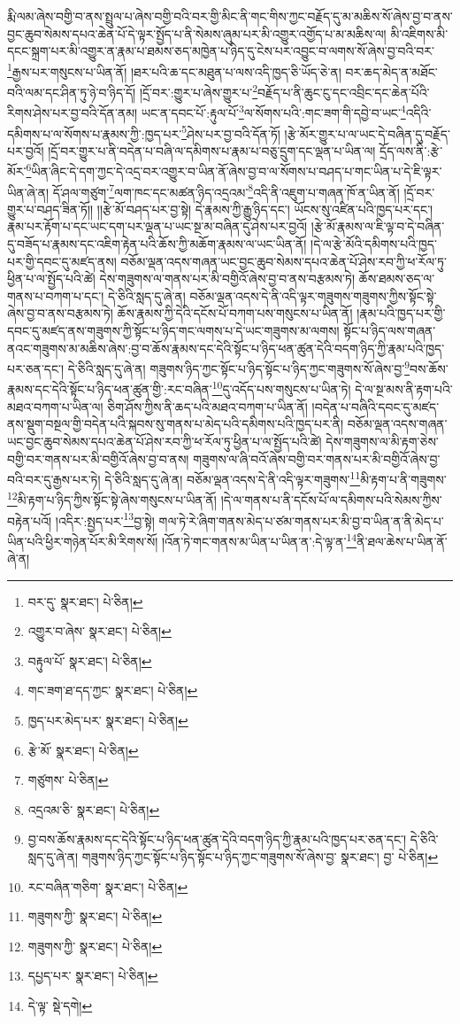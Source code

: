 རྨི་ལམ་ཞེས་བགྱི་བ་ནས་སྤྲུལ་པ་ཞེས་བགྱི་བའི་བར་གྱི་མིང་ནི་གང་གིས་ཀྱང་བརྗོད་དུ་མ་མཆིས་སོ་ཞེས་བྱ་བ་ནས་བྱང་ཆུབ་སེམས་དཔའ་ཆེན་པོ་དེ་ལྟར་སྤྱོད་པ་ནི་སེམས་ཞུམ་པར་མི་འགྱུར་འགྱོད་པ་མ་མཆིས་ལ། མི་འཇིགས་མི་དངང་སྐྲག་པར་མི་འགྱུར་ན་རྣམ་པ་ཐམས་ཅད་མཁྱེན་པ་ཉིད་དུ་ངེས་པར་འབྱུང་བ་ལགས་སོ་ཞེས་བྱ་བའི་བར་\footnote{བར་དུ་  སྣར་ཐང་།  པེ་ཅིན། }རྒྱས་པར་གསུངས་པ་ཡིན་ནོ། །ཐར་པའི་ཆ་དང་མཐུན་པ་ལས་འདི་ཁྱད་ཅི་ཡོད་ཅེ་ན། བར་ཆད་མེད་ན་མཐོང་བའི་ལམ་དང་ཤིན་ཏུ་ཉེ་བ་ཉིད་དོ། །དྲོ་བར་:གྱུར་པ་ཞེས་གྱུར་པ་\footnote{འགྱུར་བ་ཞེས་  སྣར་ཐང་།  པེ་ཅིན། }བརྗོད་པ་ནི་ཆུང་ངུ་དང་འབྲིང་དང་ཆེན་པོའི་རིགས་ཤེས་པར་བྱ་བའི་དོན་ནམ། ཡང་ན་དབང་པོ་:རྟུལ་པོ་\footnote{བརྟུལ་པོ་  སྣར་ཐང་།  པེ་ཅིན། }ལ་སོགས་པའི་:གང་ཟག་གི་དབྱེ་བ་ཡང་\footnote{གང་ཟག་ཐ་དད་ཀྱང་  སྣར་ཐང་།  པེ་ཅིན། }འདིའི་དམིགས་པ་ལ་སོགས་པ་རྣམས་ཀྱི་:ཁྱད་པར་\footnote{ཁྱད་པར་མེད་པར་  སྣར་ཐང་།  པེ་ཅིན། }ཤེས་པར་བྱ་བའི་དོན་ཏོ། །རྩེ་མོར་གྱུར་པ་ལ་ཡང་དེ་བཞིན་དུ་བརྗོད་པར་བྱའོ། །དྲོ་བར་གྱུར་པ་ནི་བདེན་པ་བཞི་ལ་དམིགས་པ་རྣམ་པ་བཅུ་དྲུག་དང་ལྡན་པ་ཡིན་ལ། དྲོད་ལས་ནི་:རྩེ་མོར་\footnote{རྩེ་མོ་  སྣར་ཐང་།  པེ་ཅིན། }ཡིན་ཞིང་དེ་དག་ཀྱང་དེ་འདྲ་བར་འགྱུར་བ་ཡིན་ནོ་ཞེས་བྱ་བ་ལ་སོགས་པ་བཤད་པ་གང་ཡིན་པ་དེ་ཇི་ལྟར་ཡིན་ཞེ་ན། དོ་ཤལ་གཙུག་\footnote{གཙུགས་  པེ་ཅིན། }ལག་ཁང་དང་མཚན་ཉིད་འདྲའམ་\footnote{འདྲའམ་ཅི་  སྣར་ཐང་།  པེ་ཅིན། }འདི་ནི་འཇུག་པ་གཞན་ཁོ་ན་ཡིན་ནོ། །དྲོ་བར་གྱུར་པ་བཤད་ཟིན་ཏོ།། །།རྩེ་མོ་བཤད་པར་བྱ་སྟེ། དེ་རྣམས་ཀྱི་རྒྱུ་ཉིད་དང་། ཡོངས་སུ་འཛིན་པའི་ཁྱད་པར་དང་། རྣམ་པར་རྟོག་པ་དང་ཡང་དག་པར་ལྡན་པ་ཡང་སྔ་མ་བཞིན་དུ་ཤེས་པར་བྱའོ། །རྩེ་མོ་རྣམས་ལ་ཇི་ལྟ་བ་དེ་བཞིན་དུ་བཟོད་པ་རྣམས་དང་འཇིག་རྟེན་པའི་ཆོས་ཀྱི་མཆོག་རྣམས་ལ་ཡང་ཡིན་ནོ། །དེ་ལ་རྩེ་མོའི་དམིགས་པའི་ཁྱད་པར་གྱི་དབང་དུ་མཛད་ནས། བཅོམ་ལྡན་འདས་གཞན་ཡང་བྱང་ཆུབ་སེམས་དཔའ་ཆེན་པོ་ཤེས་རབ་ཀྱི་ཕ་རོལ་ཏུ་ཕྱིན་པ་ལ་སྤྱོད་པའི་ཚེ། དེས་གཟུགས་ལ་གནས་པར་མི་བགྱིའོ་ཞེས་བྱ་བ་ནས་བརྩམས་ཏེ། ཆོས་ཐམས་ཅད་ལ་གནས་པ་བཀག་པ་དང་། དེ་ཅིའི་སླད་དུ་ཞེ་ན། བཅོམ་ལྡན་འདས་དེ་ནི་འདི་ལྟར་གཟུགས་གཟུགས་ཀྱིས་སྟོང་སྟེ་ཞེས་བྱ་བ་ནས་བརྩམས་ཏེ། ཆོས་རྣམས་ཀྱི་དེའི་དངོས་པོ་བཀག་པས་གསུངས་པ་ཡིན་ནོ། །རྣམ་པའི་ཁྱད་པར་གྱི་དབང་དུ་མཛད་ནས་གཟུགས་ཀྱི་སྟོང་པ་ཉིད་གང་ལགས་པ་དེ་ཡང་གཟུགས་མ་ལགས། སྟོང་པ་ཉིད་ལས་གཞན་ནའང་གཟུགས་མ་མཆིས་ཞེས་:བྱ་བ་ཆོས་རྣམས་དང་དེའི་སྟོང་པ་ཉིད་ཕན་ཚུན་དེའི་བདག་ཉིད་ཀྱི་རྣམ་པའི་ཁྱད་པར་ཅན་དང་། དེ་ཅིའི་སླད་དུ་ཞེ་ན། གཟུགས་ཉིད་ཀྱང་སྟོང་པ་ཉིད་སྟོང་པ་ཉིད་ཀྱང་གཟུགས་སོ་ཞེས་བྱ་\footnote{བྱ་བས་ཆོས་རྣམས་དང་དེའི་སྟོང་པ་ཉིད་ཕན་ཚུན་དེའི་བདག་ཉིད་ཀྱི་རྣམ་པའི་ཁྱད་པར་ཅན་དང་། དེ་ཅིའི་སླད་དུ་ཞེ་ན། གཟུགས་ཉིད་ཀྱང་སྟོང་པ་ཉིད་སྟོང་པ་ཉིད་ཀྱང་གཟུགས་སོ་ཞེས་བྱ་  སྣར་ཐང་། བྱ་  པེ་ཅིན། }བས་ཆོས་རྣམས་དང་དེའི་སྟོང་པ་ཉིད་ཕན་ཚུན་གྱི་:རང་བཞིན་\footnote{རང་བཞིན་གཅིག་  སྣར་ཐང་།  པེ་ཅིན། }དུ་འདོད་པས་གསུངས་པ་ཡིན་ཏེ། དེ་ལ་སྔ་མས་ནི་རྟག་པའི་མཐའ་བཀག་པ་ཡིན་ལ། ཅིག་ཤོས་ཀྱིས་ནི་ཆད་པའི་མཐའ་བཀག་པ་ཡིན་ནོ། །བདེན་པ་བཞིའི་དབང་དུ་མཛད་ནས་སྡུག་བསྔལ་གྱི་བདེན་པའི་སྐབས་སུ་གནས་པ་མེད་པའི་དམིགས་པའི་ཁྱད་པར་ནི། བཅོམ་ལྡན་འདས་གཞན་ཡང་བྱང་ཆུབ་སེམས་དཔའ་ཆེན་པོ་ཤེས་རབ་ཀྱི་ཕ་རོལ་ཏུ་ཕྱིན་པ་ལ་སྤྱོད་པའི་ཚེ། དེས་གཟུགས་ལ་མི་རྟག་ཅེས་བགྱི་བར་གནས་པར་མི་བགྱིའོ་ཞེས་བྱ་བ་ནས། གཟུགས་ལ་ཞི་བའོ་ཞེས་བགྱི་བར་གནས་པར་མི་བགྱིའོ་ཞེས་བྱ་བའི་བར་དུ་རྒྱས་པར་ཏེ། དེ་ཅིའི་སླད་དུ་ཞེ་ན། བཅོམ་ལྡན་འདས་དེ་ནི་འདི་ལྟར་གཟུགས་\footnote{གཟུགས་ཀྱི་  སྣར་ཐང་།  པེ་ཅིན། }མི་རྟག་པ་ནི་གཟུགས་\footnote{གཟུགས་ཀྱི་  སྣར་ཐང་།  པེ་ཅིན། }མི་རྟག་པ་ཉིད་ཀྱིས་སྟོང་སྟེ་ཞེས་གསུངས་པ་ཡིན་ནོ། །དེ་ལ་གནས་པ་ནི་དངོས་པོ་ལ་དམིགས་པའི་སེམས་ཀྱིས་བརྟེན་པའོ། །འདིར་:སྤྱད་པར་\footnote{དཔྱད་པར་  སྣར་ཐང་།  པེ་ཅིན། }བྱ་སྟེ། གལ་ཏེ་རེ་ཞིག་གནས་མེད་པ་ཙམ་གནས་པར་མི་བྱ་བ་ཡིན་ན་ནི་མེད་པ་ཡིན་པའི་ཕྱིར་གཉེན་པོར་མི་རིགས་སོ། །འོན་ཏེ་གང་གནས་མ་ཡིན་པ་ཡིན་ན་:དེ་ལྟ་ན་\footnote{དེ་ལྟ་  སྡེ་དགེ། }ནི་ཐལ་ཆེས་པ་ཡིན་ནོ་ཞེ་ན། 
